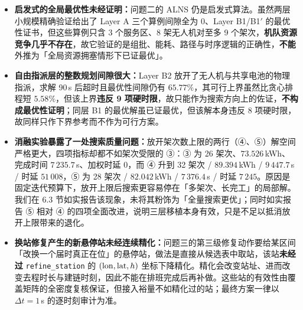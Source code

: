 \begin{itemize}
	\item \textbf{启发式的全局最优性未经证明：}问题二的 ALNS 仍是启发式算法。虽然两层小规模精确验证给出了 Layer A 三个算例间隙全为 $0$、Layer B1/B1$'$ 的最优性证书，但这些算例只含 3 个服务区、8 架无人机对至多 9 个架次，\textbf{机队资源竞争几乎不存在}，故它验证的是组批、能耗、路径与时序逻辑的正确性，\textbf{不能}外推为「全局资源拥塞情形下已证最优」。
	\item \textbf{自由指派层的整数规划间隙很大：}Layer B2 放开了无人机与共享电池的物理指派，求解 90\,s 后超时且最优性间隙仍有 $65.77\%$，其可行上界虽然比贪心排程短 $5.58\%$，但该上界\textbf{违反 9 项硬时限}，故只能作为搜索方向上的佐证，\textbf{不构成最优性证明}；同层 B1 的最优解虽已证最优，但该解本身违反 8 项硬时限，故同样只作下界参考而不作为可行方案。
	\item \textbf{消融实验暴露了一处搜索质量问题：}放开架次数上限的两行（④、⑤）解空间严格更大，四项指标却都不如架次受限的 ③：③ 为 26 架次、$73.526$\,kWh、完成时间 $7\,235.7$\,s、加权时延 $0$，而 ④ 升到 32 架次 / $89.394$\,kWh / $9\,447.7$\,s / 时延 $51\,008$，⑤ 为 28 架次 / $82.042$\,kWh / $7\,376.4$\,s / 时延 $7\,245$。原因是固定迭代预算下，放开上限后搜索更容易停在「多架次、长完工」的局部解。我们在 6.3 节如实报告该现象，未将其粉饰为「全量搜索更优」；同时如实报告 ⑤ 相对 ④ 的四项全面改进，说明三层移植本身有效，只是不足以抵消放开上限带来的退化。
	\item \textbf{换站修复产生的新悬停站未经连续精化：}问题三的第三级修复动作要给某区间「改换一个届时真正在位」的悬停站，做法是直接从候选表中取站，该站\textbf{未经过} \texttt{refine\_station} 的 $({\rm lon},{\rm lat},h)$ 坐标下降精化。精化会改变站址、进而改变去程时长与建链时刻，因此不能在排班完成后再补做。这些站的有效性由覆盖矩阵的全密度复核保证，但接入裕量不如精化过的站；最终方案一律以 $\Delta t=1$\,s 的逐时刻审计为准。

\end{itemize}
